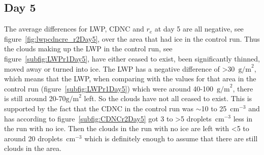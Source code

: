 \subsection{Day 5}
The average differences for LWP, CDNC and $r_e$ at day 5 are all negative, see figure~\ref{fig:lwpcdncre_r2Day5}, over the area that had ice in the control run. Thus the clouds making up the LWP in the control run, see figure~\ref{subfig:LWPr1Day5}, have either ceased to exist, been significantly thinned, moved away or turned into ice. The LWP has a negative difference of >30~$\text{g/m}^2$, which means that the LWP, when comparing with the values for that area in the control run (figure~\ref{subfig:LWPr1Day5}) which were around 40-100~$\text{g/m}^2$, there is still around 20-70$\text{g/m}^2$ left. So the clouds have not all ceased to exist. This is supported by the fact that the CDNC in the control run was $\sim$10 to 25~$\text{cm}^{-3}$ and has according to figure~\ref{subfig:CDNCr2Day5} got 3 to >5 droplets~$\text{cm}^{-3}$ less in the run with no ice. Then the clouds in the run with no ice are left with <5 to around 20 droplets~$\text{cm}^{-3}$ which is definitely enough to assume that there are still clouds in the area.
